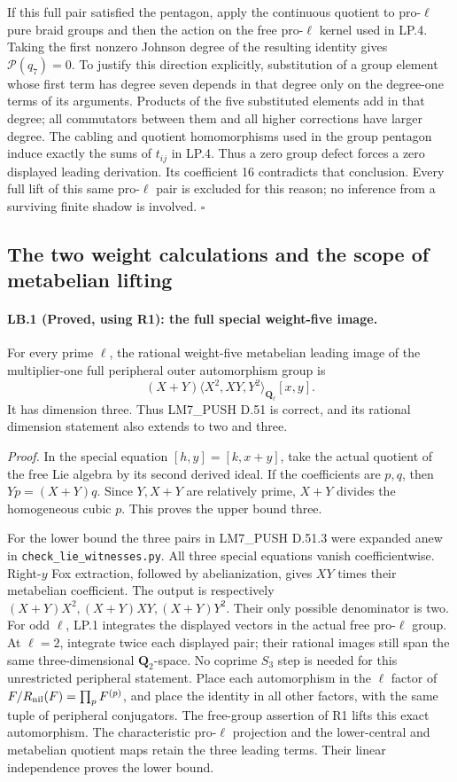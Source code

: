 If this full pair satisfied the pentagon, apply the continuous
quotient to pro-$\ell$ pure braid groups and then the action on
the free pro-$\ell$ kernel used in LP.4. Taking the first
nonzero Johnson degree of the resulting identity gives
$\mathcal P(q_7)=0$. To justify this direction explicitly,
substitution of a group element whose first term has degree seven
depends in that degree only on the degree-one terms of its
arguments. Products of the five substituted elements add in that
degree; all commutators between them and all higher corrections
have larger degree. The cabling and quotient homomorphisms used
in the group pentagon induce exactly the sums of $t_{ij}$ in
LP.4. Thus a zero group defect forces a zero displayed leading
derivation. Its coefficient 16 contradicts that conclusion.
Every full lift of this same pro-$\ell$ pair is excluded for this
reason; no inference from a surviving finite shadow is involved.
\hfill$\square$

\subsection{The two weight calculations and the scope of metabelian lifting}

\paragraph{LB.1 (Proved, using R1): the full special weight-five image.}
For every prime $\ell$, the rational weight-five metabelian leading
image of the multiplier-one full peripheral outer automorphism
group is
\[
 (X+Y)\langle X^2,XY,Y^2\rangle_{\mathbf Q_\ell}[x,y].
\]
It has dimension three. Thus LM7\_PUSH D.51 is correct, and
its rational dimension statement also extends to two and three.

\emph{Proof.}
In the special equation $[h,y]=[k,x+y]$, take the actual quotient
of the free Lie algebra by its second derived ideal. If the
coefficients are $p,q$, then $Yp=(X+Y)q$. Since $Y,X+Y$ are
relatively prime, $X+Y$ divides the homogeneous cubic $p$.
This proves the upper bound three.

For the lower bound the three pairs in LM7\_PUSH D.51.3 were
expanded anew in \texttt{check\_lie\_witnesses.py}. All three
special equations vanish coefficientwise. Right-$y$ Fox
extraction, followed by abelianization, gives $XY$ times their
metabelian coefficient. The output is respectively
$(X+Y)X^2,(X+Y)XY,(X+Y)Y^2$. Their only possible denominator is
two. For odd $\ell$, LP.1 integrates the displayed vectors in
the actual free pro-$\ell$ group. At $\ell=2$, integrate twice
each displayed pair; their rational images still span the same
three-dimensional $\mathbf Q_2$-space. No coprime $S_3$ step is
needed for this unrestricted peripheral statement.
Place each automorphism in the $\ell$ factor of
$F/R_{\rm nil}(F)=\prod_pF^{(p)}$, and place the identity in all
other factors, with the same tuple of peripheral conjugators.
The free-group assertion of R1 lifts this exact automorphism.
The characteristic pro-$\ell$ projection and the lower-central
and metabelian quotient maps retain the three leading terms.
Their linear independence proves the lower bound.

